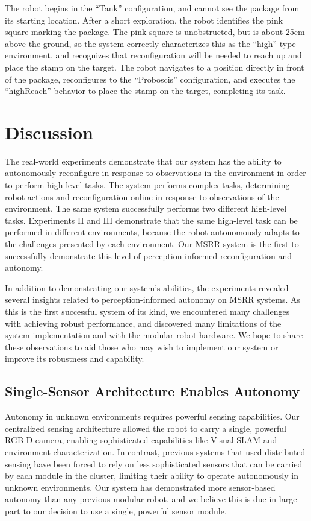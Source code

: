 \documentclass[journal]{IEEEtran}
\begin{document}
The robot begins in the ``Tank'' configuration, and cannot see the package from its starting location.  After a short exploration, the robot identifies the pink square marking the package.  The pink square is unobstructed, but is about 25cm above the ground, so the system correctly characterizes this as the ``high''-type environment, and recognizes that reconfiguration will be needed to reach up and place the stamp on the target.  The robot navigates to a position directly in front of the package, reconfigures to the ``Proboscis'' configuration, and executes the ``highReach'' behavior to place the stamp on the target, completing its task.
%
\section{Discussion}
\label{sec:discussion}
The real-world experiments demonstrate that our system has the ability to autonomously reconfigure in response to observations in the environment in order to perform high-level tasks. The system performs complex tasks, determining robot actions and reconfiguration online in response to observations of the environment. The same system successfully performs two different high-level tasks. Experiments II and III demonstrate that the same high-level task can be performed in different environments, because the robot autonomously adapts to the challenges presented by each environment. Our MSRR system is the first to successfully demonstrate this level of perception-informed reconfiguration and autonomy.

In addition to demonstrating our system's abilities, the experiments revealed several insights related to perception-informed autonomy on MSRR systems. As this is the first successful system of its kind, we encountered many challenges with achieving robust performance, and discovered many limitations of the system implementation and with the modular robot hardware. We hope to share these observations to aid those who may wish to implement our system or improve its robustness and capability.
%
\subsection{Single-Sensor Architecture Enables Autonomy}
%
Autonomy in unknown environments requires powerful sensing capabilities.  Our centralized sensing architecture allowed the robot to carry a single, powerful RGB-D camera, enabling sophisticated capabilities like Visual SLAM and environment characterization. In contrast, previous systems that used distributed sensing have been forced to rely on less sophisticated sensors that can be carried by each module in the cluster, limiting their ability to operate autonomously in unknown environments.   Our system has demonstrated more sensor-based autonomy than any previous modular robot, and we believe this is due in large part to our decision to use a single, powerful sensor module.
\end{document}
